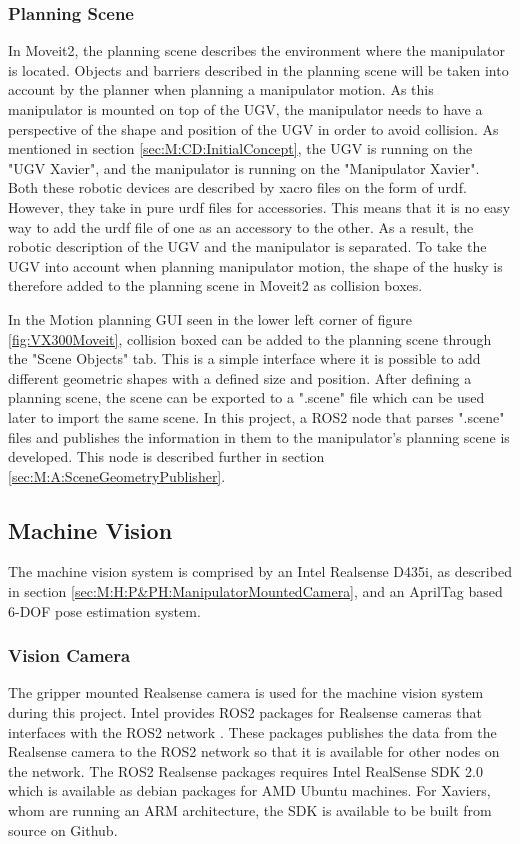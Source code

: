\subsubsection{Planning Scene}
In Moveit2, the planning scene describes the environment where the manipulator is located. Objects and barriers described in the planning scene will be taken into account by the planner when planning a manipulator motion. As this manipulator is mounted on top of the UGV, the manipulator needs to have a perspective of the shape and position of the UGV in order to avoid collision. As mentioned in section \ref{sec:M:CD:InitialConcept}, the UGV is running on the "UGV Xavier", and the manipulator is running on the "Manipulator Xavier". Both these robotic devices are described by xacro files on the form of urdf. However, they take in pure urdf files for accessories. This means that it is no easy way to add the urdf file of one as an accessory to the other. As a result, the robotic description of the UGV and the manipulator is separated. To take the UGV into account when planning manipulator motion, the shape of the husky is therefore added to the planning scene in Moveit2 as collision boxes.

In the Motion planning GUI seen in the lower left corner of figure \ref{fig:VX300Moveit}, collision boxed can be added to the planning scene through the "Scene Objects" tab. This is a simple interface where it is possible to add different geometric shapes with a defined size and position. After defining a planning scene, the scene can be exported to a ".scene" file which can be used later to import the same scene. In this project, a ROS2 node that parses ".scene" files and publishes the information in them to the manipulator's planning scene is developed. This node is described further in section \ref{sec:M:A:SceneGeometryPublisher}.

\subsection{Machine Vision} \label{sec:M:MRC:MachineVision}
The machine vision system is comprised by an Intel Realsense D435i, as described in section \ref{sec:M:H:P&PH:ManipulatorMountedCamera}, and an AprilTag based 6-DOF pose estimation system.

\subsubsection{Vision Camera} 
The gripper mounted Realsense camera is used for the machine vision system during this project. Intel provides ROS2 packages for Realsense cameras that interfaces with the ROS2 network \cite{realsense_ros_repo}. These packages publishes the data from the Realsense camera to the ROS2 network so that it is available for other nodes on the network. The ROS2 Realsense packages requires Intel RealSense SDK 2.0 which is available as debian packages for AMD Ubuntu machines. For Xaviers, whom are running an ARM architecture, the SDK is available to be built from source on Github\cite{realsense_jetson_guide}.

